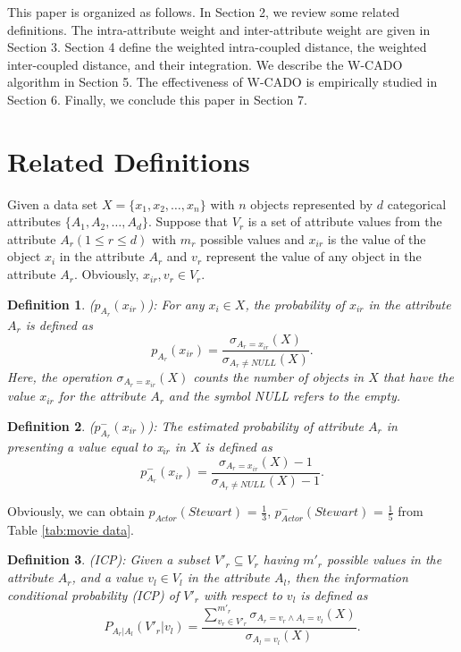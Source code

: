\documentclass[review]{elsarticle}
\newtheorem{definition}{Definition}
\begin{document}
This paper is organized as follows. In Section 2, we review some related definitions. The intra-attribute weight and inter-attribute weight are given in Section 3. Section 4 define the weighted intra-coupled distance, the weighted inter-coupled distance, and their integration. We describe the W-CADO algorithm in Section 5. The effectiveness of W-CADO is empirically studied in Section 6. Finally, we conclude this paper in Section 7.

\section{Related Definitions}
Given a data set ${X} = \{x_1,x_2,\dots,x_n\}$ with $n$ objects represented by $d$ categorical attributes $\{A_1,A_2,\dots,A_d\}$. Suppose that $V_r$ is a set of attribute values from the attribute $A_r (1 \leq r \leq d)$ with $m_r$ possible values and $x_{ir}$ is the value of the object $x_i$ in the attribute $A_r$ and $v_r$ represent the value of any object in the attribute $A_r$. Obviously, $x_{ir}, v_r \in V_r$.

\begin{definition} \cite{Santos2015Categorical} ($p_{A_r}(x_{ir})$): For any $x_i \in X$, the probability of $x_{ir}$ in the attribute $A_r$ is defined as
\begin{equation}
p_{A_r}(x_{ir}) = \frac{\sigma_{A_r = x_{ir}}(X)}{\sigma_{A_r \neq NULL}(X)}.
\label{equ1}
\end{equation}
Here, the operation $\sigma_{A_r = x_{ir}}(X)$ counts the number of objects in $X$ that have the value $x_{ir}$ for the attribute $A_{r}$ and the symbol NULL refers to the empty.
\end{definition}

\begin{definition} \cite{Santos2015Categorical} ($p_{A_r}^-(x_{ir})$): The estimated probability of attribute $A_{r}$ in presenting a value equal to x$_{ir}$ in $X$ is defined as
\begin{equation}
p_{A_r}^-(x_{ir}) = \frac{\sigma_{A_r = x_{ir}}(X) - 1}{\sigma_{A_r \neq NULL}(X) - 1}.
\label{equ2}
\end{equation}
\end{definition}

Obviously, we can obtain $p_{Actor}(Stewart)$ = $\frac{1}{3}$,  $p_{Actor}^-(Stewart)$ = $\frac{1}{5}$ from Table \ref{tab:movie data}.

\begin{definition} \cite{Wang2015Coupled} (ICP): Given a subset ${V'_r} \subseteq V_r$ having $m'_{r}$ possible values in the attribute $A_r$, and a value $v_l \in V_l$ in the attribute $A_l$, then the information conditional probability (ICP) of $V'_r$ with respect to $v_l$ is defined as
\begin{equation}
P_{{A_r}|{A_l}}(V'_r | v_l) = \frac{\sum_{v_r \in V'_r}^{m'_{r}}\sigma_{A_r = v_r \wedge A_l = v_l}(X)}{\sigma_{A_l = v_l}(X)}.
\label{equ3}
\end{equation}
\end{definition}
\end{document}
